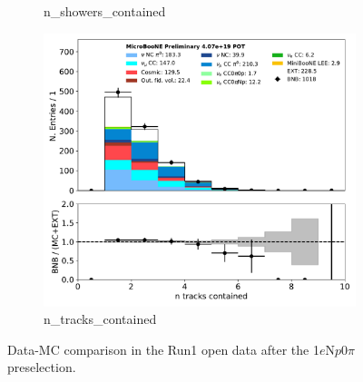 \documentclass[a4paper]{article}
\newcommand{\npsel}{1$e$N$p$0$\pi$ }
\begin{document}
\begin{figure}[H]
\begin{center}
\begin{subfigure}[b]{0.3\textwidth}
    \caption{\label{fig:1eNp:dataMCRun1:n_showers_contained} n\_showers\_contained }
    \end{subfigure}
    \begin{subfigure}[b]{0.3\textwidth}
    \centering
    \includegraphics[width=1.00\textwidth]{1eNp/dataMCRun1/n_tracks_contained01152020.pdf}
    \caption{\label{fig:1eNp:dataMCRun1:n_tracks_contained} n\_tracks\_contained }
    \end{subfigure}
\caption{\label{fig:1eNp:dataMCRun1:numu2}Data-MC comparison in the Run1 open data after the \npsel preselection.}
\end{center}
\end{figure}
\end{document}
